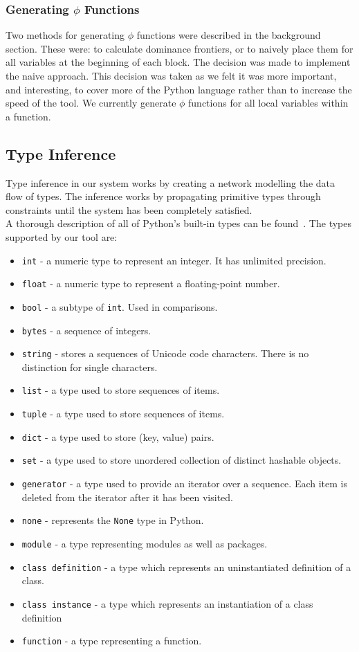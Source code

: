 \documentclass[12pt, titlepage]{article}
\begin{document}
\subsubsection{Generating $\phi$ Functions}
Two methods for generating $\phi$ functions were described in the background section. These were: to calculate dominance frontiers, or to naively place them for all variables at the beginning of each block. The decision was made to implement the naive approach. This decision was taken as we felt it was more important, and interesting, to cover more of the Python language rather than to increase the speed of the tool. We currently generate $\phi$ functions for all local variables within a function.

\subsection{Type Inference}
Type inference in our system works by creating a network modelling the data flow of types. The inference works by propagating primitive types through constraints until the system has been completely satisfied. \\
\indent A thorough description of all of Python's built-in types can be found~\cite{pythonTypeDocs}. The types supported by our tool are:
\begin{itemize}
	\item \texttt{int} - a numeric type to represent an integer. It has unlimited precision.
	\item \texttt{float} - a numeric type to represent a floating-point number.
	\item \texttt{bool} - a subtype of \texttt{int}. Used in comparisons.
	\item \texttt{bytes} - a sequence of integers.
	\item \texttt{string} - stores a sequences of Unicode code characters. There is no distinction for single characters.
	\item \texttt{list} - a type used to store sequences of items.
	\item \texttt{tuple} - a type used to store sequences of items.
	\item \texttt{dict} - a type used to store (key, value) pairs.
	\item \texttt{set} - a type used to store unordered collection of distinct hashable objects.
	\item \texttt{generator} - a type used to provide an iterator over a sequence. Each item is deleted from the iterator after it has been visited.
	\item \texttt{none} - represents the \texttt{None} type in Python.
	\item \texttt{module} - a type representing modules as well as packages.
	\item \texttt{class definition} - a type which represents an uninstantiated definition of a class.
	\item \texttt{class instance} - a type which represents an instantiation of a class definition
	\item \texttt{function} - a type representing a function.
\end{itemize}
\end{document}
